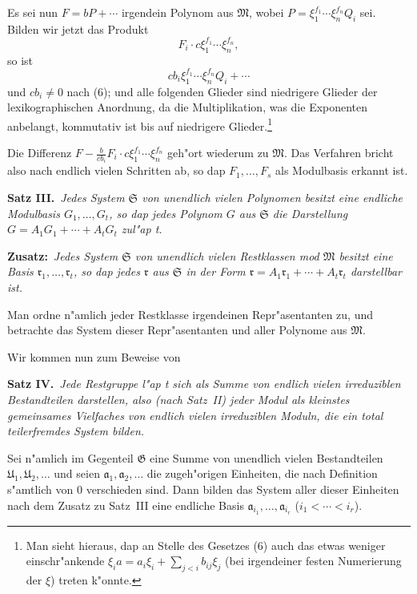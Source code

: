 \documentclass[12pt,a4paper]{article}
\begin{document}
Es sei nun $F = bP + \cdots$ irgendein Polynom aus $\mathfrak{M}$, wobei $P = \xi_1^{f_1} \cdots \xi_n^{f_n} Q_i$ sei. Bilden wir jetzt das Produkt
\[
F_i \cdot c\xi_1^{f_1} \cdots \xi_n^{f_n},
\]
so ist
\[
c b_i \xi_1^{f_1} \cdots \xi_n^{f_n} Q_i + \cdots
\]
und $c b_i \neq 0$ nach (6); und alle folgenden Glieder sind niedrigere Glieder der lexikographischen Anordnung, da die Multiplikation, was die Exponenten anbelangt, kommutativ ist bis auf niedrigere Glieder.\footnote{Man sieht hieraus, dap an Stelle des Gesetzes (6) auch das etwas weniger einschr"ankende $\xi_i a = a_i \xi_i + \sum_{j<i} b_{ij} \xi_j$ (bei irgendeiner festen Numerierung der $\xi$) treten k"onnte.}

Die Differenz $F - \frac{b}{c b_i} F_i \cdot c\xi_1^{f_1} \cdots \xi_n^{f_n}$ geh"ort wiederum zu $\mathfrak{M}$. Das Verfahren bricht also nach endlich vielen Schritten ab, so dap $F_1,\ldots,F_s$ als Modulbasis erkannt ist.

\smallskip
\noindent\textbf{Satz III.}\ \textit{Jedes System $\mathfrak{S}$ von unendlich vielen Polynomen besitzt eine endliche Modulbasis $G_1,\ldots,G_t$, so dap jedes Polynom $G$ aus $\mathfrak{S}$ die Darstellung $G = A_1 G_1 + \cdots + A_t G_t$ zul"ap t.}

\smallskip
\noindent\textbf{Zusatz:}\ \textit{Jedes System $\mathfrak{S}$ von unendlich vielen Restklassen mod $\mathfrak{M}$ besitzt eine Basis $\mathfrak{r}_1,\ldots,\mathfrak{r}_t$, so dap jedes $\mathfrak{r}$ aus $\mathfrak{S}$ in der Form $\mathfrak{r} = A_1 \mathfrak{r}_1 + \cdots + A_t \mathfrak{r}_t$ darstellbar ist.}

Man ordne n"amlich jeder Restklasse irgendeinen Repr"asentanten zu, und betrachte das System dieser Repr"asentanten und aller Polynome aus $\mathfrak{M}$.

\smallskip
Wir kommen nun zum Beweise von

\smallskip
\noindent\textbf{Satz IV.}\ \textit{Jede Restgruppe l"ap t sich als Summe von endlich vielen irreduziblen Bestandteilen darstellen, also (nach Satz~II) jeder Modul als kleinstes gemeinsames Vielfaches von endlich vielen irreduziblen Moduln, die ein total teilerfremdes System bilden.}

Sei n"amlich im Gegenteil $\mathfrak{G}$ eine Summe von unendlich vielen Bestandteilen $\mathfrak{U}_1, \mathfrak{U}_2, \ldots$ und seien $\mathfrak{a}_1, \mathfrak{a}_2, \ldots$ die zugeh"origen Einheiten, die nach Definition s"amtlich von $0$ verschieden sind. Dann bilden das System aller dieser Einheiten nach dem Zusatz zu Satz~III eine endliche Basis $\mathfrak{a}_{i_1},\ldots,\mathfrak{a}_{i_r}$ ($i_1 < \cdots < i_r$).
\end{document}
